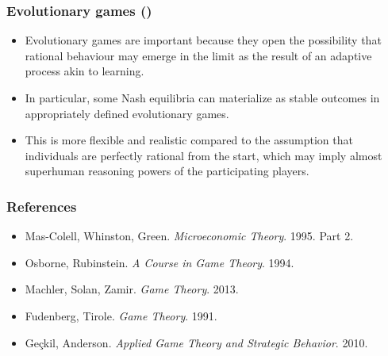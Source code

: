 \documentclass[10pt]{beamer}
\theoremstyle{definition}
\begin{document}
\begin{frame}[fragile]
\frametitle{Evolutionary games ()}
\begin{itemize}\itemsep1em
\item Evolutionary games are important because they open the possibility that rational behaviour may emerge in the limit as the result of an adaptive process akin to learning.
\item In particular, some Nash equilibria can materialize as stable outcomes in appropriately defined evolutionary games.
\item This is more flexible and realistic compared to the assumption that individuals are perfectly rational from the start, which may imply almost superhuman reasoning powers of the participating players.
\end{itemize}
\end{frame}


\begin{frame}[fragile]
\frametitle{References}
\begin{itemize}\itemsep1em
	\item Mas-Colell, Whinston, Green. \emph{Microeconomic Theory}. 1995. Part 2.
	\item Osborne, Rubinstein. \emph{A Course in Game Theory}. 1994.
	\item Machler, Solan, Zamir. \emph{Game Theory}. 2013.
	\item Fudenberg, Tirole. \emph{Game Theory}. 1991.
	\item Ge\c ckil, Anderson. \emph{Applied Game Theory and Strategic Behavior}. 2010.
\end{itemize}
\end{frame}
\end{document}
